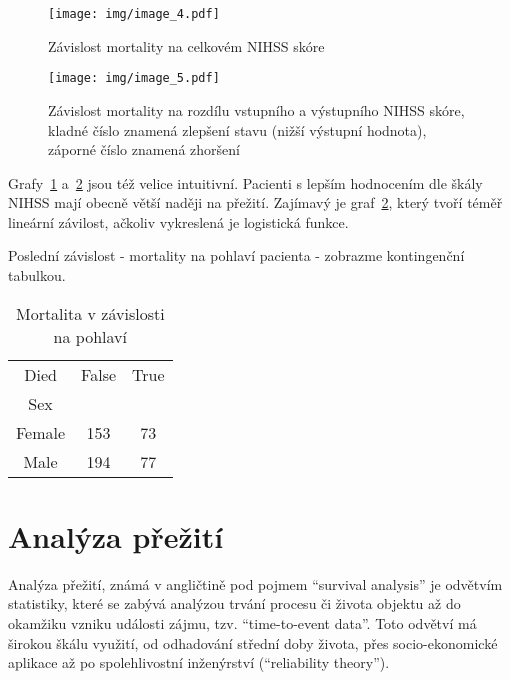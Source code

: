 \begin{figure}[htbp]
    \texttt{[image: img/image\_4.pdf]}
    \centering
    \caption{Závislost mortality na celkovém NIHSS skóre}
    \label{img:mrs-tss}
\end{figure}
\FloatBarrier

\begin{figure}[htbp]
    \texttt{[image: img/image\_5.pdf]}
    \centering
    \caption{Závislost mortality na rozdílu vstupního a výstupního NIHSS skóre, kladné číslo znamená zlepšení stavu (nižší výstupní hodnota), záporné číslo znamená zhoršení}
    \label{img:mrs-tss2}
\end{figure}
\FloatBarrier

Grafy~\ref{img:mrs-tss} a~\ref{img:mrs-tss2} jsou též velice intuitivní.
Pacienti s lepším hodnocením dle škály NIHSS mají obecně větší naději na přežití.
Zajímavý je graf~\ref{img:mrs-tss2}, který tvoří téměř lineární závilost, ačkoliv vykreslená je logistická funkce.

Poslední závislost - mortality na pohlaví pacienta - zobrazme kontingenční tabulkou.

\begin{table}[htbp]
    \centering

    \begin{tabular}{ccc}
        \toprule
        Died    & False & True  \\
        Sex     &       &       \\
        \midrule
        Female  & 153   & 73    \\
        Male    & 194   & 77    \\
        \bottomrule
    \end{tabular}    
    
    \caption{Mortalita v závislosti na pohlaví}
    \label{table:sex-mortality}
\end{table}
\FloatBarrier

\newpage
\section{Analýza přežití}

Analýza přežití, známá v angličtině pod pojmem \enquote{survival analysis} je odvětvím statistiky, které se zabývá analýzou trvání procesu či života objektu až do okamžiku vzniku události zájmu, tzv. \enquote{time-to-event data}.
Toto odvětví má širokou škálu využití, od odhadování střední doby života, přes socio-ekonomické aplikace až po spolehlivostní inženýrství (\enquote{reliability theory}).

